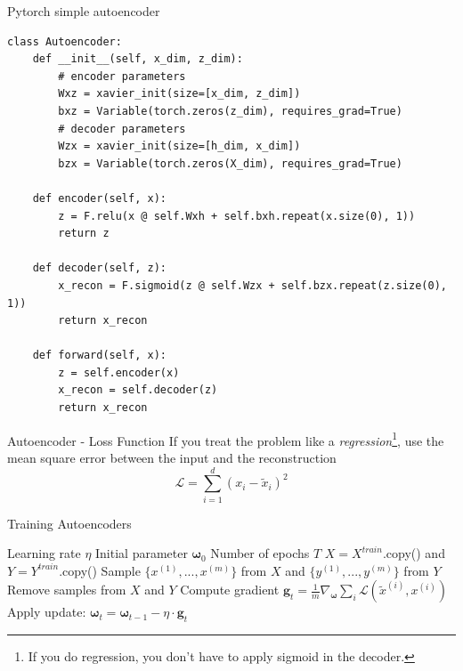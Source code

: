 \documentclass{beamer}
\begin{document}
\begin{frame}[fragile]{Pytorch simple autoencoder}
\begin{verbatim}
class Autoencoder:
    def __init__(self, x_dim, z_dim):
        # encoder parameters
        Wxz = xavier_init(size=[x_dim, z_dim])
        bxz = Variable(torch.zeros(z_dim), requires_grad=True)
        # decoder parameters
        Wzx = xavier_init(size=[h_dim, x_dim])
        bzx = Variable(torch.zeros(X_dim), requires_grad=True)
    
    def encoder(self, x):
        z = F.relu(x @ self.Wxh + self.bxh.repeat(x.size(0), 1))
        return z
    
    def decoder(self, z):
        x_recon = F.sigmoid(z @ self.Wzx + self.bzx.repeat(z.size(0), 1))
        return x_recon
    
    def forward(self, x):
        z = self.encoder(x)
        x_recon = self.decoder(z)
        return x_recon
\end{verbatim}
\end{frame}

\begin{frame}{Autoencoder - Loss Function}
If you treat the problem like a \textit{regression}\footnote{If you do regression, you don't have to apply sigmoid in the decoder.}, use the mean square error between the input and the reconstruction
\begin{equation}
\mathcal{L} = \sum_{i=1}^d (x_i-\tilde{x}_i)^2
\end{equation}
\end{frame}

\begin{frame}{Training Autoencoders}
\begin{algorithm}[H]
	\begin{algorithmic}
		\REQUIRE Learning rate $\eta$
		\REQUIRE Initial parameter $\bm{\omega}_0$
		\REQUIRE Number of epochs $T$
		\STATE $X =X^{train}$.copy() and $Y =Y^{train}$.copy()
		\STATE Sample $\{x^{(1)},...,x^{(m)}\}$ from $X$ and $\{y^{(1)},...,y^{(m)}\}$ from $Y$
		\STATE Remove samples from $X$ and $Y$
		\STATE Compute gradient $\bm{g}_t=\frac{1}{m}\nabla_{\bm{\omega}}\sum_i \mathcal{L}(\tilde{x}^{(i)}, x^{(i)})$  
		\STATE Apply update: $\mathbf{\omega}_t=\bm{\omega}_{t-1}-\eta\cdot \bm{g}_t$
		\ENDWHILE
		\ENDFOR
	\end{algorithmic}
	\caption{Pseudocode for Stochastic Gradient Training}
	\label{alg:sgd}
\end{algorithm}
\end{frame}
\end{document}
